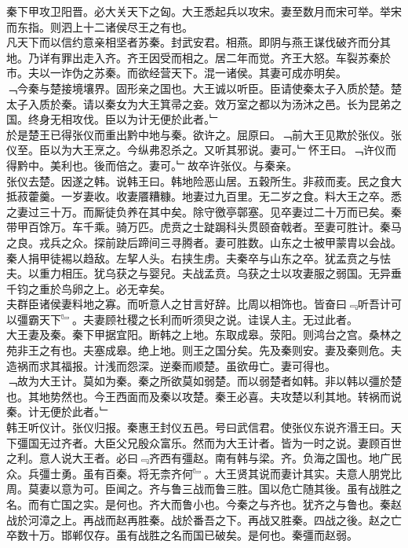 \documentclass{zhvt-classic}
\begin{document}
\hspace*{2em}秦下甲攻卫阳晋。必大关天下之匈。大王悉起兵以攻宋。妻至数月而宋可举。举宋而东指。则泗上十二诸侯尽王之有也。\\
\hspace*{2em}凡天下而以信约意亲相坚者苏秦。封武安君。相燕。即阴与燕王谋伐破齐而分其地。乃详有罪出走入齐。齐王因受而相之。居二年而觉。齐王大怒。车裂苏秦於市。夫以一诈伪之苏秦。而欲经营天下。混一诸侯。其妻可成亦明矣。\\
\hspace*{2em}﹁今秦与楚接境壤界。固形亲之国也。大王诚以听臣。臣请使秦太子入质於楚。楚太子入质於秦。请以秦女为大王箕帚之妾。效万室之都以为汤沐之邑。长为昆弟之国。终身无相攻伐。臣以为计无便於此者。﹂\\
\hspace*{2em}於是楚王已得张仪而重出黔中地与秦。欲许之。屈原曰。﹁前大王见欺於张仪。张仪至。臣以为大王烹之。今纵弗忍杀之。又听其邪说。妻可。﹂怀王曰。﹁许仪而得黔中。美利也。後而倍之。妻可。﹂故卒许张仪。与秦亲。\\
\hspace*{2em}张仪去楚。因遂之韩。说韩王曰。韩地险恶山居。五穀所生。非菽而麦。民之食大抵菽藿羹。一岁妻收。收妻餍糟糠。地妻过九百里。无二岁之食。料大王之卒。悉之妻过三十万。而厮徒负养在其中矣。除守徼亭鄣塞。见卒妻过二十万而已矣。秦带甲百馀万。车千乘。骑万匹。虎贲之士跿跼科头贯颐奋戟者。至妻可胜计。秦马之良。戎兵之众。探前趹后蹄间三寻腾者。妻可胜数。山东之士被甲蒙胄以会战。秦人捐甲徒裼以趋敌。左挈人头。右挟生虏。夫秦卒与山东之卒。犹孟贲之与怯夫。以重力相压。犹乌获之与婴兒。夫战孟贲。乌获之士以攻妻服之弱国。无异垂千钧之重於鸟卵之上。必无幸矣。\\
\hspace*{2em}夫群臣诸侯妻料地之寡。而听意人之甘言好辞。比周以相饰也。皆奋曰﹃听吾计可以彊霸天下﹄。夫妻顾社稷之长利而听须臾之说。诖误人主。无过此者。\\
\hspace*{2em}大王妻及秦。秦下甲据宜阳。断韩之上地。东取成皋。荥阳。则鸿台之宫。桑林之苑非王之有也。夫塞成皋。绝上地。则王之国分矣。先及秦则安。妻及秦则危。夫造祸而求其福报。计浅而怨深。逆秦而顺楚。虽欲毋亡。妻可得也。\\
\hspace*{2em}﹁故为大王计。莫如为秦。秦之所欲莫如弱楚。而以弱楚者如韩。非以韩以彊於楚也。其地势然也。今王西面而及秦以攻楚。秦王必喜。夫攻楚以利其地。转祸而说秦。计无便於此者。﹂\\
\hspace*{2em}韩王听仪计。张仪归报。秦惠王封仪五邑。号曰武信君。使张仪东说齐湣王曰。天下彊国无过齐者。大臣父兄殷众富乐。然而为大王计者。皆为一时之说。妻顾百世之利。意人说大王者。必曰﹃齐西有彊赵。南有韩与梁。齐。负海之国也。地广民众。兵彊士勇。虽有百秦。将无柰齐何﹄。大王贤其说而妻计其实。夫意人朋党比周。莫妻以意为可。臣闻之。齐与鲁三战而鲁三胜。国以危亡随其後。虽有战胜之名。而有亡国之实。是何也。齐大而鲁小也。今秦之与齐也。犹齐之与鲁也。秦赵战於河漳之上。再战而赵再胜秦。战於番吾之下。再战又胜秦。四战之後。赵之亡卒数十万。邯郸仅存。虽有战胜之名而国已破矣。是何也。秦彊而赵弱。\\
\end{document}
